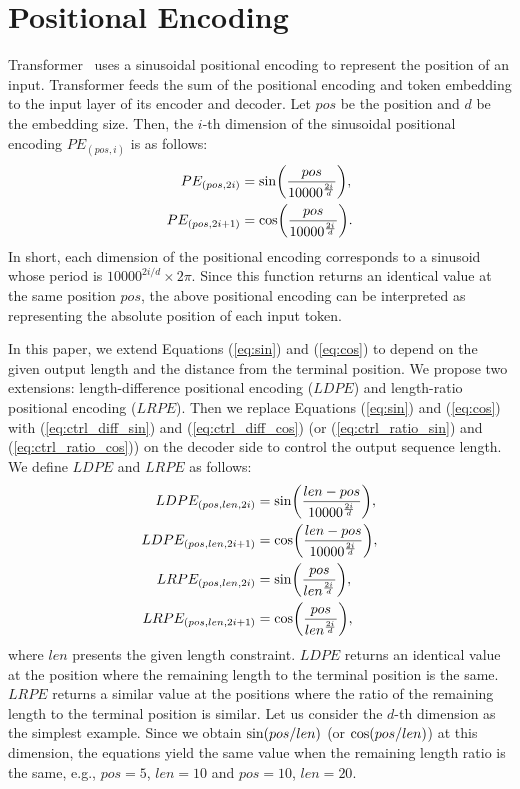 \documentclass[11pt,a4paper]{article}
\begin{document}
\section{Positional Encoding}
Transformer~\cite{NIPS2017_7181} uses a sinusoidal positional encoding to represent the position of an input.
Transformer feeds the sum of the positional encoding and token embedding to the input layer of its encoder and decoder.
Let $pos$ be the position and $d$ be the embedding size.
Then, the $i$-th dimension of the sinusoidal positional encoding $PE_{(pos, i)}$ is as follows:
\begin{align}
  PE_{(pos, 2i)} &= {\rm sin}\bigg(\frac{pos}{10000^{\frac{2i}{d}}}\bigg), \label{eq:sin}\\
  PE_{(pos, 2i+1)} &= {\rm cos}\bigg(\frac{pos}{10000^{\frac{2i}{d}}}\bigg). \label{eq:cos}
\end{align}
In short, each dimension of the positional encoding corresponds to a sinusoid whose period is $10000^{2i / d} \times 2\pi$.
Since this function returns an identical value at the same position $pos$, the above positional encoding can be interpreted as representing the absolute position of each input token.


In this paper, we extend Equations (\ref{eq:sin}) and (\ref{eq:cos}) to depend on the given output length and the distance from the terminal position.
We propose two extensions: length-difference positional encoding ($LDPE$) and length-ratio positional encoding ($LRPE$).
Then we replace Equations (\ref{eq:sin}) and (\ref{eq:cos}) with (\ref{eq:ctrl_diff_sin}) and (\ref{eq:ctrl_diff_cos}) (or (\ref{eq:ctrl_ratio_sin}) and (\ref{eq:ctrl_ratio_cos})) on the decoder side to control the output sequence length.
We define $LDPE$ and $LRPE$ as follows:
\begin{align}
  LDPE_{(pos, len, 2i)} &= {\rm sin}\bigg(\frac{len - pos}{10000^{\frac{2i}{d}}}\bigg), \label{eq:ctrl_diff_sin}\\
  LDPE_{(pos, len, 2i+1)} &= {\rm cos}\bigg(\frac{len - pos}{10000^{\frac{2i}{d}}}\bigg), \label{eq:ctrl_diff_cos} \\
  LRPE_{(pos, len, 2i)} &= {\rm sin}\bigg(\frac{pos}{len^{\frac{2i}{d}}}\bigg), \label{eq:ctrl_ratio_sin}\\
  LRPE_{(pos, len, 2i+1)} &= {\rm cos}\bigg(\frac{pos}{len^{\frac{2i}{d}}}\bigg), \label{eq:ctrl_ratio_cos}
\end{align}
where $len$ presents the given length constraint.
$LDPE$ returns an identical value at the position where the remaining length to the terminal position is the same.
$LRPE$ returns a similar value at the positions where the ratio of the remaining length to the terminal position is similar.
Let us consider the $d$-th dimension as the simplest example.
Since we obtain ${\rm sin}(pos / len)$ (or ${\rm cos}(pos / len)$) at this dimension, the equations yield the same value when the remaining length ratio is the same, e.g., $pos = 5$, $len = 10$ and $pos = 10$, $len = 20$.
\end{document}
